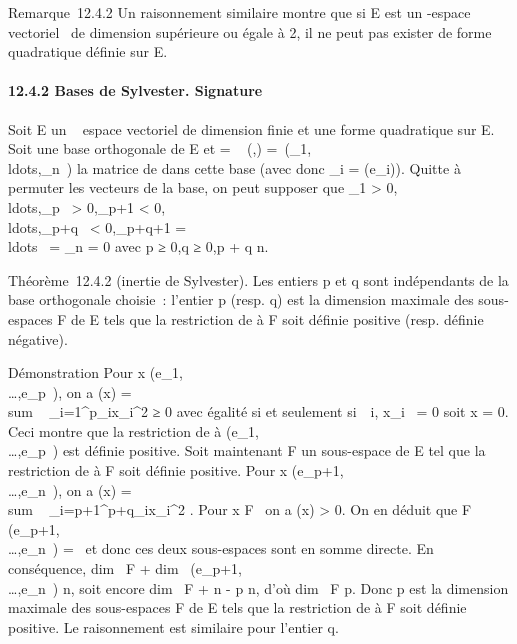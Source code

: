 \documentclass[]{article}
\begin{document}
Remarque~12.4.2 Un raisonnement similaire montre que si E est un
-espace vectoriel ~de dimension supérieure ou égale à 2, il ne peut pas
exister de forme quadratique définie sur E.

\paragraph{12.4.2 Bases de Sylvester. Signature}

Soit E un ~ espace vectoriel de dimension finie et \Phi une forme
quadratique sur E. Soit  une base orthogonale de E et \Omega
= \mathrmMat~ (\Phi,)
=\
\mathrmdiag(\alpha_1,\\ldots,\alpha_n~)
la matrice de \Phi dans cette base (avec donc \alpha_i =
\Phi(e_i)). Quitte à permuter les vecteurs de la base, on peut
supposer que \alpha_1 >
0,\\ldots,\alpha_p~
> 0,\alpha_p+1 <
0,\\ldots,\alpha_p+q~
< 0,\alpha_p+q+1 =
\\ldots~ =
\alpha_n = 0 avec p ≥ 0,q ≥ 0,p + q \leq n.

Théorème~12.4.2 (inertie de Sylvester). Les entiers p et q sont
indépendants de la base orthogonale choisie~: l'entier p (resp. q) est
la dimension maximale des sous-espaces F de E tels que la restriction de
\Phi à F soit définie positive (resp. définie négative).

Démonstration Pour x
\in\mathrmVect(e_1,\\\ldots,e_p~),
on a \Phi(x) = \\sum ~
_i=1^p\alpha_ix_i^2 ≥ 0 avec égalité
si et seulement si~\forall~i, x_i~ = 0 soit x
= 0. Ceci montre que la restriction de \Phi à
\mathrmVect(e_1,\\\ldots,e_p~)
est définie positive. Soit maintenant F un sous-espace de E tel que la
restriction de \Phi à F soit définie positive. Pour x
\in\mathrmVect(e_p+1,\\\ldots,e_n~),
on a \Phi(x) = \\sum ~
_i=p+1^p+q\alpha_ix_i^2 . Pour x \in
F \diagdown\0\ on a \Phi(x) > 0. On
en déduit que F
\bigcap\mathrmVect(e_p+1,\\\ldots,e_n~)
= \0\ et donc ces deux sous-espaces
sont en somme directe. En conséquence, dim~ F
+ dim~
\mathrmVect(e_p+1,\\\ldots,e_n~)
\leq n, soit encore dim~ F + n - p \leq n, d'où
dim~ F \leq p. Donc p est la dimension maximale
des sous-espaces F de E tels que la restriction de \Phi à F soit définie
positive. Le raisonnement est similaire pour l'entier q.
\end{document}
